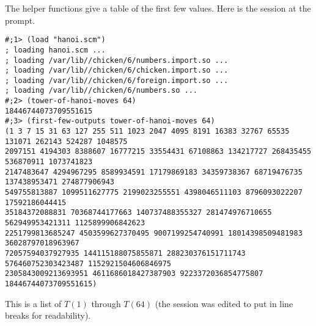 The helper functions give a table of the first few 
values.
Here is the session at the prompt.
\begin{lstlisting}
#;1> (load "hanoi.scm")
; loading hanoi.scm ...
; loading /var/lib//chicken/6/numbers.import.so ...
; loading /var/lib//chicken/6/chicken.import.so ...
; loading /var/lib//chicken/6/foreign.import.so ...
; loading /var/lib//chicken/6/numbers.so ...
#;2> (tower-of-hanoi-moves 64)
18446744073709551615
#;3> (first-few-outputs tower-of-hanoi-moves 64)
(1 3 7 15 31 63 127 255 511 1023 2047 4095 8191 16383 32767 65535 131071 262143 524287 1048575 
2097151 4194303 8388607 16777215 33554431 67108863 134217727 268435455 536870911 1073741823 
2147483647 4294967295 8589934591 17179869183 34359738367 68719476735 137438953471 274877906943 
549755813887 1099511627775 2199023255551 4398046511103 8796093022207 17592186044415 
35184372088831 70368744177663 140737488355327 281474976710655 562949953421311 1125899906842623 
2251799813685247 4503599627370495 9007199254740991 18014398509481983 36028797018963967 
72057594037927935 144115188075855871 288230376151711743 576460752303423487 1152921504606846975 
2305843009213693951 4611686018427387903 9223372036854775807 18446744073709551615)
\end{lstlisting}
\noindent This is a list of $T(1)$ through $T(64)$ (the session was 
edited to put in line breaks for readability).
\endinput

